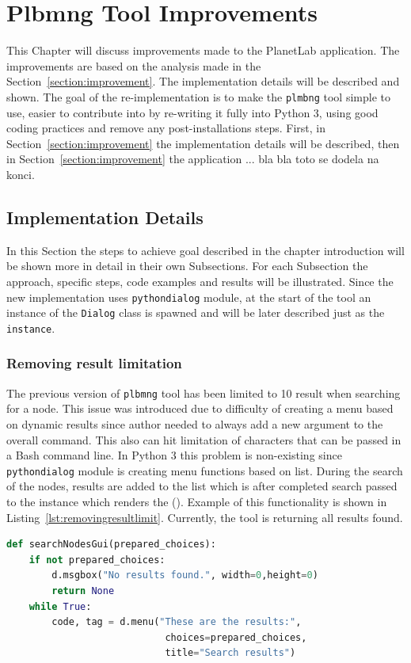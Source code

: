 \chapter{Plbmng Tool Improvements}
\label{chapter:improve}
This Chapter will discuss improvements made to the PlanetLab application. The improvements are based on the analysis made in the Section~\ref{section:improvement}. The implementation details will be described and shown. The goal of the re-implementation is to make the \texttt{plmbng} tool simple to use, easier to contribute into by re-writing it fully into Python 3, using good coding practices and remove any post-installations steps. First, in Section~\ref{section:improvement} the implementation details will be described, then in Section~\ref{section:improvement} the application  ... bla bla toto se dodela na konci. 
\section{Implementation Details}
\label{section:implementapproach}
In this Section the steps to achieve goal described in the chapter introduction will be shown more in detail in their own Subsections. For each Subsection the approach, specific steps, code examples and results will be illustrated. Since the new implementation uses \texttt{pythondialog} module, at the start of the tool an instance of the \texttt{Dialog} class is spawned and will be later described just as the \texttt{instance}.
\subsection{Removing result limitation}
The previous version of \texttt{plbmng} tool has been limited to 10 result when searching for a node. This issue was introduced due to difficulty of creating a menu based on dynamic results since author needed to always add a new argument to the overall command. This also can hit limitation of characters that can be passed in a Bash command line. In Python 3 this problem is non-existing since \texttt{pythondialog} module is creating menu functions based on list. During the search of the nodes, results are added to the list which is after completed search passed to the instance which renders the  (). Example of this functionality is shown in Listing~\ref{lst:removingresultlimit}. Currently, the tool is returning all results found.
\begin{lstlisting}[language=Python, numbers=none, label={lst:removingresultlimit}, caption=Removing Result Limitation, frame=single, showstringspaces=false]
def searchNodesGui(prepared_choices):
	if not prepared_choices:
		d.msgbox("No results found.", width=0,height=0)
		return None
	while True:
		code, tag = d.menu("These are the results:",
							choices=prepared_choices,
							title="Search results")
\end{lstlisting}
